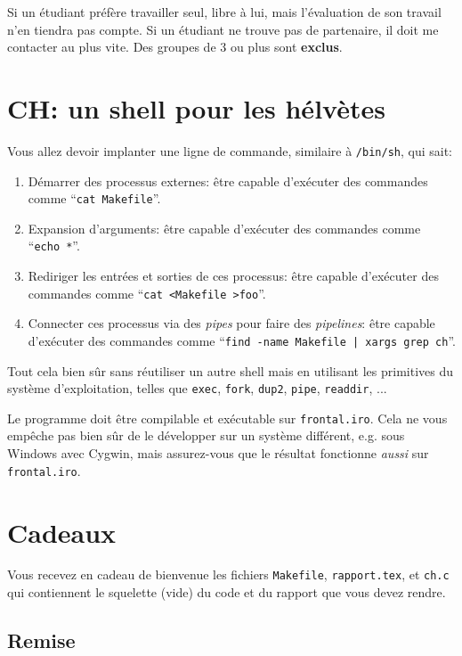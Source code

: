 \documentclass{article}
\begin{document}
Si un étudiant préfère travailler seul, libre à lui, mais l'évaluation de
son travail n'en tiendra pas compte.  Si un étudiant ne trouve pas de
partenaire, il doit me contacter au plus vite.  Des groupes de 3 ou plus
sont \textbf{exclus}.

\newpage
\section{CH: un shell pour les hélvètes}

Vous allez devoir implanter une ligne de commande, similaire
à \texttt{/bin/sh}, qui sait:
\begin{enumerate}
\item Démarrer des processus externes: être capable d'exécuter des commandes
  comme ``\texttt{cat Makefile}''.
\item Expansion d'arguments: être capable d'exécuter des commandes comme
  ``\texttt{echo *}''.
\item Rediriger les entrées et sorties de ces processus: être capable
  d'exécuter des commandes comme ``\texttt{cat <Makefile >foo}''.
\item Connecter ces processus via des \emph{pipes} pour faire des
  \emph{pipelines}: être capable d'exécuter des commandes comme
  ``\texttt{find -name Makefile | xargs grep ch}''.
\end{enumerate}

Tout cela bien sûr sans réutiliser un autre shell mais en utilisant les
primitives du système d'exploitation, telles que \texttt{exec},
\texttt{fork}, \texttt{dup2}, \texttt{pipe}, \texttt{readdir}, ...

Le programme doit être compilable et exécutable sur \texttt{frontal.iro}.
Cela ne vous empêche pas bien sûr de le développer sur un système différent,
e.g. sous Windows avec Cygwin, mais assurez-vous que le résultat fonctionne
\emph{aussi} sur \texttt{frontal.iro}.

\section{Cadeaux}

Vous recevez en cadeau de bienvenue les fichiers \texttt{Makefile},
\texttt{rapport.tex}, et \texttt{ch.c} qui contiennent le squelette (vide)
du code et du rapport que vous devez rendre.

\subsection{Remise}
\end{document}
